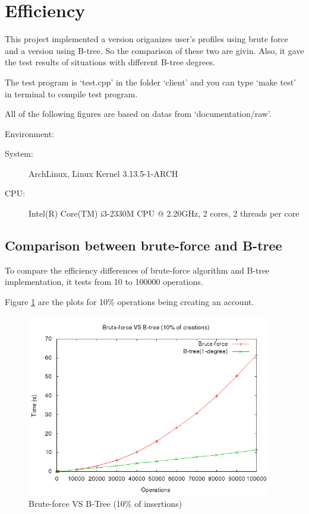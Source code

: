 \documentclass[a4paper, 11pt]{article}
\begin{document}
\section{Efficiency}
This project implemented a version origanizes user's profiles using brute force and a version using B-tree. So the comparison of these two are givin. Also, it gave the test results of situations with different B-tree degrees.

The test program is `test.cpp' in the folder `client' and you can type `make test' in terminal to compile test program.

All of the following figures are based on datas from `documentation/raw'.

\begin{flushleft}
  Environment:
  \begin{small}
    \begin{description}
    \item[System:] ArchLinux, Linux Kernel 3.13.5-1-ARCH
    \item[CPU:] Intel(R) Core(TM) i3-2330M CPU @ 2.20GHz, 2 cores, 2 threads per core
    \end{description}
  \end{small}
\end{flushleft}

\subsection{Comparison between brute-force and B-tree}
To compare the efficiency differences of brute-force algorithm and B-tree implementation, it tests from 10 to 100000 operations.

Figure \ref{bruteVSbtree10} are the plots for 10\% operations being creating an account.
\begin{figure}[htbp]
  \centering
  \includegraphics[width=0.95\textwidth]{./plots/bruteVSbtree10.png}
  \caption{Brute-force VS B-Tree (10\% of insertions)}
  \label{bruteVSbtree10}
\end{figure}
\end{document}
